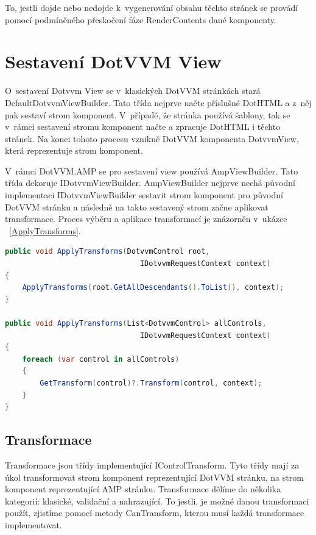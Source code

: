  To, jestli dojde nebo nedojde k~vygenerování obsahu těchto stránek se provádí pomocí podmíněného přeskočení fáze RenderContents dané komponenty.
 
\section{Sestavení DotVVM View}
O~sestavení Dotvvm View se v~klasických DotVVM stránkách stará DefaultDotvvmViewBuilder. Tato třída nejprve načte příslušné DotHTML a z~něj pak sestaví strom komponent. V~případě, že stránka používá šablony, tak se v~rámci sestavení stromu komponent načte a zpracuje DotHTML i těchto stránek. Na konci tohoto procesu vznikně DotVVM komponenta  DotvvmView, která reprezentuje strom komponent.

V~rámci DotVVM.AMP se pro sestavení view používá AmpViewBuilder. Tato třída dekoruje IDotvvmViewBuilder. AmpViewBuilder nejprve nechá původní implementaci IDotvvmViewBuilder sestavit strom komponent pro původní DotVVM stránku a následně na takto sestavený strom začne aplikovat transformace. Proces výběru a aplikace transformací je znázorněn v~ukázce ~\ref{ApplyTransforms}. 
\begin{lstlisting}[language=c#, caption= Ukázka aplikace transformací ,label=ApplyTransforms,captionpos=t]
public void ApplyTransforms(DotvvmControl root,
                               IDotvvmRequestContext context)
{
    ApplyTransforms(root.GetAllDescendants().ToList(), context);
}

public void ApplyTransforms(List<DotvvmControl> allControls,
                               IDotvvmRequestContext context)
{
    foreach (var control in allControls)
    {
        GetTransform(control)?.Transform(control, context);
    }
}
\end{lstlisting}
\subsection*{Transformace}
Transformace jsou třídy implementující IControlTransform. Tyto třídy mají za úkol transformovat strom komponent reprezentující DotVVM stránku, na strom komponent reprezentující AMP stránku. Transformace dělíme do několika kategorií: klasické, validační a nahrazující. To jestli, je možné danou transformaci použít, zjistíme pomocí metody CanTransform, kterou musí každá transformace implementovat.
